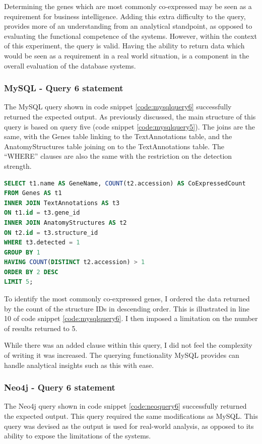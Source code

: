 Determining the genes which are most commonly co-expressed may be seen as a requirement for business intelligence. Adding this extra difficulty to the query, provides more of an understanding from an analytical standpoint, as opposed to evaluating the functional competence of the systems. However, within the context of this experiment, the query is valid. Having the ability to return data which would be seen as a requirement in a real world situation, is a component in the overall evaluation of the database systems.

\subsubsection*{MySQL - Query 6 statement}\label{mysqlquery6statement}
The MySQL query shown in code snippet \ref{code:mysqlquery6} successfully returned the expected output. As previously discussed, the main structure of this query is based on query five (code snippet \ref{code:mysqlquery5}). The joins are the same, with the Genes table linking to the TextAnnotations table, and the AnatomyStructures table joining on to the TextAnnotations table. The ``WHERE'' clauses are also the same with the restriction on the detection strength.

\begin{lstlisting}[language=SQL, caption=MySQL query 6 statement. Which Genes are most commonly co-expressed?., label=code:mysqlquery6]
SELECT t1.name AS GeneName, COUNT(t2.accession) AS CoExpressedCount
FROM Genes AS t1
INNER JOIN TextAnnotations AS t3
ON t1.id = t3.gene_id
INNER JOIN AnatomyStructures AS t2
ON t2.id = t3.structure_id
WHERE t3.detected = 1
GROUP BY 1
HAVING COUNT(DISTINCT t2.accession) > 1
ORDER BY 2 DESC
LIMIT 5;
\end{lstlisting}

To identify the most commonly co-expressed genes, I ordered the data returned by the count of the structure IDs in descending order. This is illustrated in line 10 of code snippet \ref{code:mysqlquery6}. I then imposed a limitation on the number of results returned to 5.

While there was an added clause within this query, I did not feel the complexity of writing it was increased. The querying functionality MySQL provides can handle analytical insights such as this with ease.
\newpage
\subsubsection*{Neo4j - Query 6 statement}\label{neoquery6statement}
The Neo4j query shown in code snippet \ref{code:neoquery6} successfully returned the expected output. This query required the same modifications as MySQL. This query was devised as the output is used for real-world analysis, as opposed to its ability to expose the limitations of the systems.

